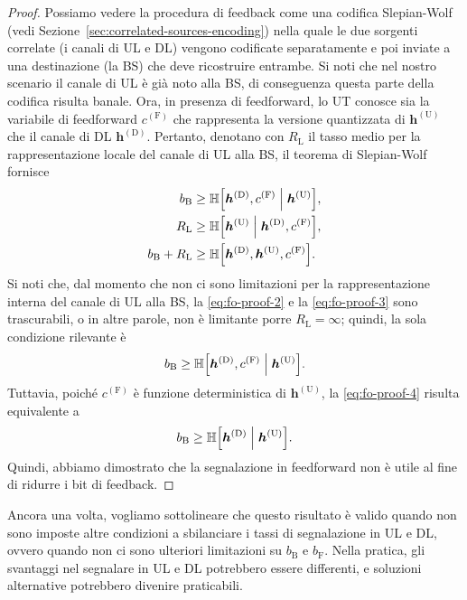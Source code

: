 \begin{proof}
    Possiamo vedere la procedura di feedback come una codifica Slepian-Wolf
    (vedi Sezione~\ref{sec:correlated-sources-encoding}) nella quale le due
    sorgenti correlate (i canali di UL e DL) vengono codificate separatamente e
    poi inviate a una destinazione (la BS) che deve ricostruire entrambe. Si
    noti che nel nostro scenario il canale di UL è già noto alla BS, di
    conseguenza questa parte della codifica risulta banale. Ora, in presenza
    di feedforward, lo UT conosce sia la variabile di feedforward
    \(c^\mathrm{(F)}\) che rappresenta la versione quantizzata di
    \(\bm{h}^\mathrm{(U)}\) che il canale di DL \(\bm{h}^\mathrm{(D)}\).
    Pertanto, denotano con \(R_\mathrm{L}\) il tasso medio per la
    rappresentazione locale del canale di UL alla BS, il teorema di
    Slepian-Wolf fornisce
    \begin{alignat}{1}
        b_\mathrm{B} &\ge \entropy{
            \bm{h}^\mathrm{(D)},c^\mathrm{(F)} \given \bm{h}^\mathrm{(U)}
        }, \label{eq:fo-proof-1} \\
        R_\mathrm{L} &\ge \entropy{
            \bm{h}^\mathrm{(U)} \given \bm{h}^\mathrm{(D)},c^\mathrm{(F)}
        }, \label{eq:fo-proof-2} \\
        b_\mathrm{B} + R_\mathrm{L} &\ge \entropy{
            \bm{h}^\mathrm{(D)},\bm{h}^\mathrm{(U)},c^\mathrm{(F)}
        }. \label{eq:fo-proof-3}
    \end{alignat}
    Si noti che, dal momento che non ci sono limitazioni per la
    rappresentazione interna del canale di UL alla BS, la \eqref{eq:fo-proof-2}
    e la \eqref{eq:fo-proof-3} sono trascurabili, o in altre parole, non è
    limitante porre \(R_\mathrm{L} = \infty\); quindi, la sola condizione
    rilevante è
    \begin{equation}
        \label{eq:fo-proof-4}
        b_\mathrm{B} \ge \entropy{
            \bm{h}^\mathrm{(D)},c^\mathrm{(F)} \given \bm{h}^\mathrm{(U)}
        }.
    \end{equation}
    Tuttavia, poiché \(c^\mathrm{(F)}\) è funzione deterministica di
    \(\bm{h}^\mathrm{(U)}\), la \eqref{eq:fo-proof-4} risulta equivalente a
    \begin{equation}
        \label{eq:fo-proof-5}
        b_\mathrm{B} \ge \entropy{
            \bm{h}^\mathrm{(D)} \given \bm{h}^\mathrm{(U)}
        }.
    \end{equation}
    Quindi, abbiamo dimostrato che la segnalazione in feedforward non è utile
    al fine di ridurre i bit di feedback.
\end{proof}

Ancora una volta, vogliamo sottolineare che questo risultato è valido quando
non sono imposte altre condizioni a sbilanciare i tassi di segnalazione in UL e
DL, ovvero quando non ci sono ulteriori limitazioni su \(b_\mathrm{B}\) e
\(b_\mathrm{F}\). Nella pratica, gli svantaggi nel segnalare in UL e DL
potrebbero essere differenti, e soluzioni alternative potrebbero divenire
praticabili.
